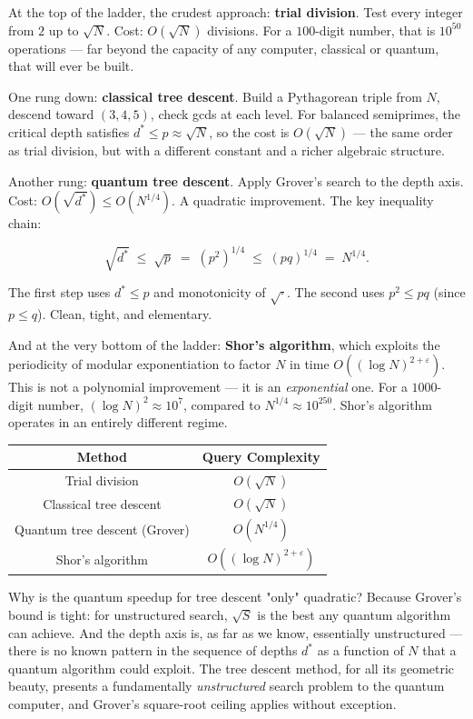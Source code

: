 At the top of the ladder, the crudest approach: \textbf{trial division}. Test every integer from $2$ up to $\sqrt{N}$. Cost: $O(\sqrt{N})$ divisions. For a $100$-digit number, that is $10^{50}$ operations --- far beyond the capacity of any computer, classical or quantum, that will ever be built.

One rung down: \textbf{classical tree descent}. Build a Pythagorean triple from $N$, descend toward $(3, 4, 5)$, check gcds at each level. For balanced semiprimes, the critical depth satisfies $d^* \leq p \approx \sqrt{N}$, so the cost is $O(\sqrt{N})$ --- the same order as trial division, but with a different constant and a richer algebraic structure.

Another rung: \textbf{quantum tree descent}. Apply Grover's search to the depth axis. Cost: $O(\sqrt{d^*}) \leq O(N^{1/4})$. A quadratic improvement. The key inequality chain:

\[
\sqrt{d^*} \;\leq\; \sqrt{p} \;=\; (p^2)^{1/4} \;\leq\; (pq)^{1/4} \;=\; N^{1/4}.
\]

The first step uses $d^* \leq p$ and monotonicity of $\sqrt{\cdot}$. The second uses $p^2 \leq pq$ (since $p \leq q$). Clean, tight, and elementary.

And at the very bottom of the ladder: \textbf{Shor's algorithm}, which exploits the periodicity of modular exponentiation to factor $N$ in time $O((\log N)^{2+\varepsilon})$. This is not a polynomial improvement --- it is an \textit{exponential} one. For a $1000$-digit number, $(\log N)^2 \approx 10^7$, compared to $N^{1/4} \approx 10^{250}$. Shor's algorithm operates in an entirely different regime.

\begin{center}
\begin{tabular}{c c}
\toprule
Method & Query Complexity \\
\midrule
Trial division & $O(\sqrt{N})$ \\
Classical tree descent & $O(\sqrt{N})$ \\
Quantum tree descent (Grover) & $O(N^{1/4})$ \\
Shor's algorithm & $O((\log N)^{2+\varepsilon})$ \\
\bottomrule
\end{tabular}
\end{center}

Why is the quantum speedup for tree descent "only" quadratic? Because Grover's bound is tight: for unstructured search, $\sqrt{S}$ is the best any quantum algorithm can achieve. And the depth axis is, as far as we know, essentially unstructured --- there is no known pattern in the sequence of depths $d^*$ as a function of $N$ that a quantum algorithm could exploit. The tree descent method, for all its geometric beauty, presents a fundamentally \textit{unstructured} search problem to the quantum computer, and Grover's square-root ceiling applies without exception.

